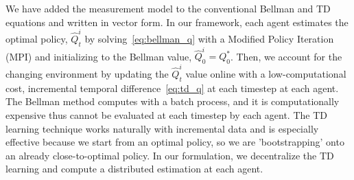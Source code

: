 \documentclass[journal]{IEEEtran}
\begin{document}
We have added the measurement model to the conventional Bellman and TD equations and written in vector form. In our framework, each agent estimates the optimal policy, $\hat{Q}^i_t$ by solving~\eqref{eq:bellman_q} with a Modified Policy Iteration (MPI) and initializing to the Bellman value, $\hat{Q}^i_0 = Q^*_0$. Then, we account for the changing environment by updating the $\hat{Q}^i_t$ value online with a low-computational cost, incremental temporal difference~\eqref{eq:td_q} at each timestep at each agent. The Bellman method computes with a batch process, and it is computationally expensive thus cannot be evaluated at each timestep by each agent. The TD learning technique works naturally with incremental data and is especially effective because we start from an optimal policy, so we are 'bootstrapping' onto an already close-to-optimal policy. In our formulation, we decentralize the TD learning and compute a distributed estimation at each agent. 
\end{document}

